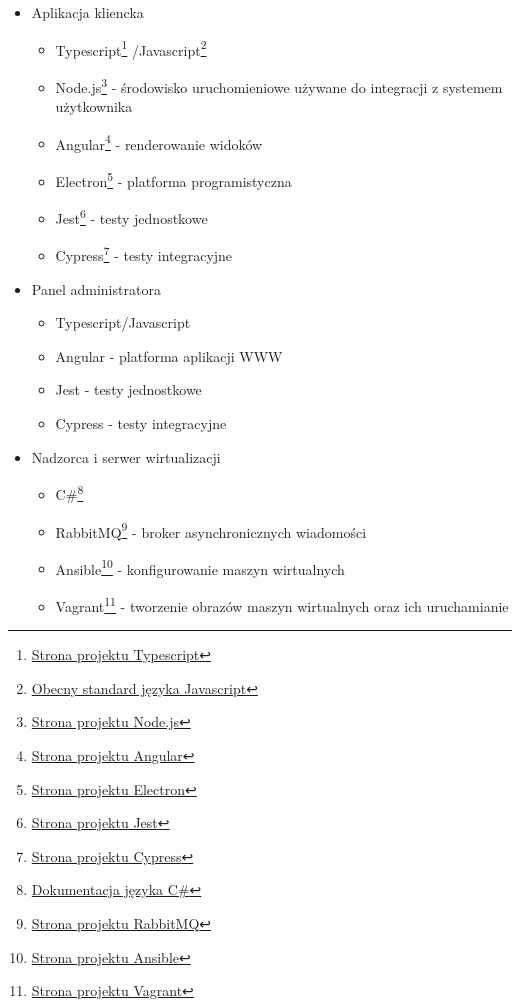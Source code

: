 \documentclass[../deliverable-two.tex]{subfiles}
\begin{document}
\begin{itemize}
    \item Aplikacja kliencka
          \begin{itemize}
              \item Typescript\footnote{\href{https://www.typescriptlang.org}{Strona projektu Typescript}}
                    /Javascript\footnote{\href{https://www.ecma-international.org/publications-and-standards/standards/ecma-262}{Obecny standard języka Javascript}}
              \item Node.js\footnote{\href{https://nodejs.org/en}{Strona projektu Node.js}} - środowisko uruchomieniowe używane do integracji z systemem użytkownika
              \item Angular\footnote{\href{https://angular.io/}{Strona projektu Angular}} - renderowanie widoków
              \item Electron\footnote{\href{https://www.electronjs.org/}{Strona projektu Electron}} - platforma programistyczna
              \item Jest\footnote{\href{https://jestjs.io/}{Strona projektu Jest}} - testy jednostkowe
              \item Cypress\footnote{\href{https://www.cypress.io/}{Strona projektu Cypress}} - testy integracyjne
          \end{itemize}
    \item Panel administratora
          \begin{itemize}
              \item Typescript/Javascript
              \item Angular - platforma aplikacji WWW
              \item Jest - testy jednostkowe
              \item Cypress - testy integracyjne
          \end{itemize}
    \item Nadzorca i serwer wirtualizacji
          \begin{itemize}
              \item C\#\footnote{\href{https://docs.microsoft.com/en-us/dotnet/csharp/}{Dokumentacja języka C\#}}
              \item RabbitMQ\footnote{\href{https://www.rabbitmq.com/}{Strona projektu RabbitMQ}} - broker asynchronicznych wiadomości
              \item Ansible\footnote{\href{https://www.ansible.com/}{Strona projektu Ansible}} - konfigurowanie maszyn wirtualnych
              \item Vagrant\footnote{\href{https://www.vagrantup.com/}{Strona projektu Vagrant}} - tworzenie obrazów maszyn wirtualnych oraz ich uruchamianie

\end{itemize}
\end{itemize}
\end{document}
